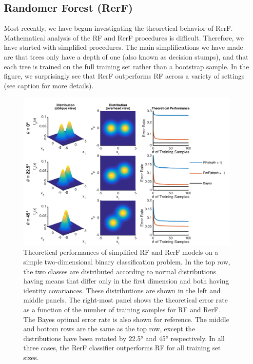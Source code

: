 \documentclass[simplex.tex]{subfiles}
\begin{document}
\subsection[Randomer Forest]{Randomer Forest (RerF)}

Most recently, we have begun investigating the theoretical behavior of RerF. Mathematical analysis of the RF and RerF procedures is difficult. Therefore, we have started with simplified procedures. The main simplifications we have made are that trees only have a depth of one (also known as decision stumps), and that each tree is trained on the full training set rather than a bootstrap sample. In the figure, we surprisingly see that RerF outperforms RF across a variety of settings (see caption for more details).

\begin{figure}[h!]
\begin{cframed}
\centering
\includegraphics[height=0.4\textheight]{../../figs/RerF.png}
\caption{
Theoretical performances of simplified RF and RerF models on a simple two-dimensional binary classification problem. In the top row, the two classes are distributed according to normal distributions having means that differ only in the first dimension and both having identity covariances. These distributions are shown in the left and middle panels. The right-most panel shows the theoretical error  rate as a function of the number of training samples for RF and RerF. The Bayes optimal error rate is also shown for reference. The middle and bottom rows are the same as the top row, except the distributions have been rotated by 22.5° and 45° respectively. In all three cases, the RerF classifier outperforms RF for all training set sizes.
}
\label{fig:RerF}
\end{cframed}
\end{figure}
\end{document}
